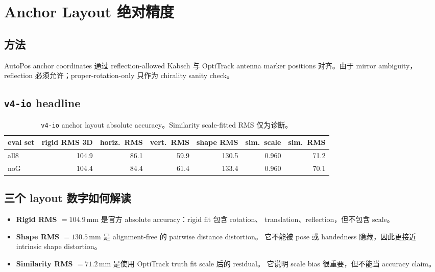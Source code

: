 \documentclass[11pt,a4paper]{article}
\newcommand{\mm}{\,\si{\milli\meter}}
\begin{document}
\section{Anchor Layout 绝对精度}
\label{sec:layout}

\subsection{方法}
AutoPos anchor coordinates 通过 reflection-allowed Kabsch 与 OptiTrack antenna marker
positions 对齐。由于 mirror ambiguity，reflection 必须允许；proper-rotation-only 只作为
chirality sanity check。

\subsection{\texttt{v4-io} headline}
\begin{table}[h]
\centering
\caption{\texttt{v4-io} anchor layout absolute accuracy。Similarity scale-fitted RMS 仅为诊断。}
\begin{tabular}{lrrrrrr}
\toprule
eval set & rigid RMS 3D & horiz.\ RMS & vert.\ RMS & shape RMS & sim.\ scale & sim.\ RMS \\
\midrule
all8 & 104.9 & 86.1 & 59.9 & 130.5 & 0.960 & 71.2 \\
noG  & 104.4 & 84.4 & 61.4 & 133.4 & 0.960 & 70.1 \\
\bottomrule
\end{tabular}
\end{table}

\subsection{三个 layout 数字如何解读}
\begin{itemize}[leftmargin=1.4em]
  \item \textbf{Rigid RMS $=104.9\mm$} 是官方 absolute accuracy：rigid fit 包含 rotation、
        translation、reflection，但不包含 scale。
  \item \textbf{Shape RMS $=130.5\mm$} 是 alignment-free 的 pairwise distance distortion。
        它不能被 pose 或 handedness 隐藏，因此更接近 intrinsic shape distortion。
  \item \textbf{Similarity RMS $=71.2\mm$} 是使用 OptiTrack truth fit scale 后的 residual。
        它说明 scale bias 很重要，但不能当 accuracy claim。
\end{itemize}
\end{document}

